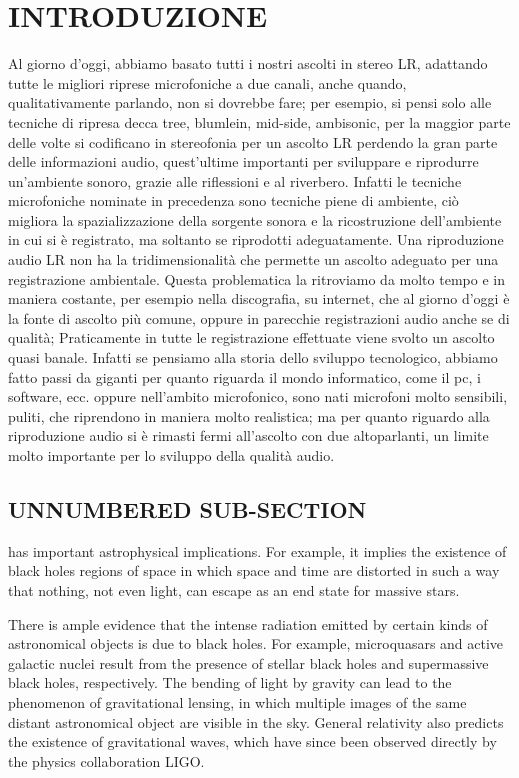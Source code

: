 \section*{INTRODUZIONE}
Al giorno d’oggi, abbiamo basato tutti i nostri ascolti in stereo LR, adattando tutte le migliori riprese microfoniche a due canali, anche quando, qualitativamente parlando, non si dovrebbe fare; per esempio, si pensi solo alle tecniche di ripresa decca tree, blumlein, mid-side, ambisonic, per la maggior parte delle volte si codificano in stereofonia per un ascolto LR perdendo la gran parte delle informazioni audio, quest’ultime importanti per sviluppare e riprodurre un’ambiente sonoro, grazie alle riflessioni e al riverbero. Infatti le tecniche microfoniche nominate in precedenza sono tecniche piene di ambiente, ciò migliora la spazializzazione della sorgente sonora e la ricostruzione dell’ambiente in cui si è registrato, ma soltanto se riprodotti adeguatamente. Una riproduzione audio LR non ha la tridimensionalità che permette un ascolto adeguato per una registrazione ambientale. Questa problematica la ritroviamo da molto tempo e in maniera costante, per esempio nella discografia, su internet, che al giorno d’oggi è la fonte di ascolto più comune, oppure in parecchie registrazioni audio anche se di qualità; Praticamente in tutte le registrazione effettuate viene svolto un ascolto quasi banale. Infatti se pensiamo alla storia dello sviluppo tecnologico, abbiamo fatto passi da giganti per quanto riguarda il mondo informatico, come il pc, i software, ecc. oppure nell’ambito microfonico, sono nati microfoni molto sensibili, puliti, che riprendono in maniera molto realistica; ma per quanto riguardo alla riproduzione audio si è rimasti fermi all’ascolto con due altoparlanti, un limite molto importante per lo sviluppo della qualità audio.
\subsection*{UNNUMBERED SUB-SECTION}

\begin{warn}
 has important astrophysical implications. For example, it
implies the existence of black holes regions of space in which space and time
are distorted in such a way that nothing, not even light, can escape as an
end state for massive stars.
\end{warn}

There is ample evidence that the intense radiation
emitted by certain kinds of astronomical objects is due to black holes. For
example, microquasars and active galactic nuclei result from the presence of
stellar black holes and supermassive black holes, respectively. The bending of
light by gravity can lead to the phenomenon of gravitational lensing, in which
multiple images of the same distant astronomical object are visible in the sky.
General relativity also predicts the existence of gravitational waves, which
have since been observed directly by the physics collaboration LIGO.
